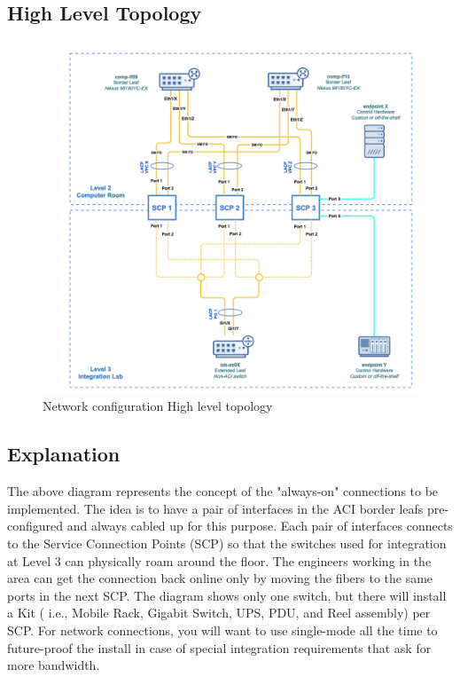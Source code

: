   \subsection{High Level Topology}
  \begin{figure}
    \includegraphics[width=14cm]{images/image-002.png}
    \centering
    \caption{Network configuration High level topology}
  \end{figure}

  \newpage
  \subsection{Explanation}
  The above diagram represents the concept of the "always-on" connections to be implemented. 
  The idea is to have a pair of interfaces in the ACI border leafs pre-configured and always cabled up for this purpose. Each pair of interfaces connects to the Service Connection Points (SCP) so that the switches used for integration at Level 3 can physically roam around the floor. The engineers working in the area can get the connection back online only by moving the fibers to the same ports in the next SCP. 
  The diagram shows only one switch, but there will install a Kit ( i.e., Mobile Rack, Gigabit Switch, UPS, PDU, and Reel assembly) per SCP.
  For network connections, you will want to use single-mode all the time to future-proof the install in case of special integration requirements that ask for more bandwidth.

